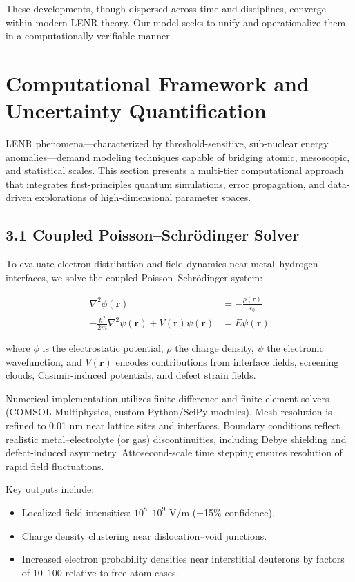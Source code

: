     These developments, though dispersed across time and disciplines, converge within modern LENR theory. Our model seeks to unify and operationalize them in a computationally verifiable manner.
    
    \section{Computational Framework and Uncertainty Quantification}
    
    LENR phenomena—characterized by threshold-sensitive, sub-nuclear energy anomalies—demand modeling techniques capable of bridging atomic, mesoscopic, and statistical scales. This section presents a multi-tier computational approach that integrates first-principles quantum simulations, error propagation, and data-driven explorations of high-dimensional parameter spaces.
    
    \subsection{3.1 Coupled Poisson–Schrödinger Solver}
    
    To evaluate electron distribution and field dynamics near metal–hydrogen interfaces, we solve the coupled Poisson–Schrödinger system:
    
    \begin{align}
    \nabla^2 \phi(\mathbf{r}) &= -\frac{\rho(\mathbf{r})}{\epsilon_0} \\
    -\frac{\hbar^2}{2m} \nabla^2 \psi(\mathbf{r}) + V(\mathbf{r}) \psi(\mathbf{r}) &= E \psi(\mathbf{r})
    \end{align}
    
    where $\phi$ is the electrostatic potential, $\rho$ the charge density, $\psi$ the electronic wavefunction, and $V(\mathbf{r})$ encodes contributions from interface fields, screening clouds, Casimir-induced potentials, and defect strain fields.
    
    Numerical implementation utilizes finite-difference and finite-element solvers (COMSOL Multiphysics, custom Python/SciPy modules). Mesh resolution is refined to 0.01 nm near lattice sites and interfaces. Boundary conditions reflect realistic metal–electrolyte (or gas) discontinuities, including Debye shielding and defect-induced asymmetry. Attosecond-scale time stepping ensures resolution of rapid field fluctuations.
    
    Key outputs include:
    
    \begin{itemize}
        \item Localized field intensities: $10^8$–$10^9$ V/m (±15\% confidence).
        \item Charge density clustering near dislocation–void junctions.
        \item Increased electron probability densities near interstitial deuterons by factors of 10–100 relative to free-atom cases.
    \end{itemize}
    
